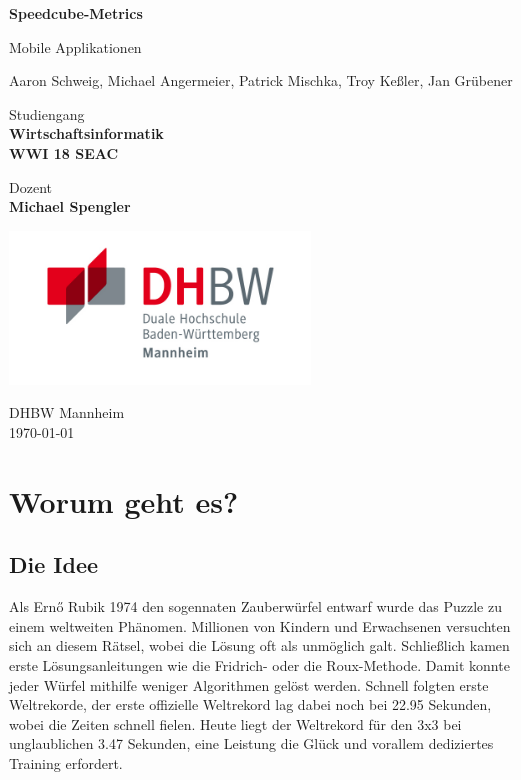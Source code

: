 \documentclass[a4paper]{article}
\theoremstyle{definition}
\begin{document}
\begin{titlepage}
	\begin{center}

		\Huge
		\textbf{Speedcube-Metrics}

		\vspace{0.5cm}
		\LARGE
		Mobile Applikationen

		\vspace{1.5cm}
		Aaron Schweig, Michael Angermeier, Patrick Mischka,
		Troy Keßler, Jan Grübener

		\vfill

		Studiengang\\
		\textbf{Wirtschaftsinformatik\\ WWI 18 SEAC}

		\vspace{0.8cm}

		Dozent\\
		\textbf{Michael Spengler}

		\vspace{0.8cm}

		\vspace{0.8cm}

		\includegraphics[width=0.6\textwidth]{img/dhbw.jpg}

		\Large
		DHBW Mannheim\\
		\today

	\end{center}
\end{titlepage}

\section{Worum geht es?}
\subsection{Die Idee}
Als Ernő Rubik 1974 den sogennaten Zauberwürfel entwarf wurde das Puzzle zu einem weltweiten Phänomen.
Millionen von Kindern und Erwachsenen versuchten sich an diesem Rätsel, wobei die Lösung oft als unmöglich
galt. Schließlich kamen erste Lösungsanleitungen wie die Fridrich- oder die Roux-Methode. Damit konnte jeder Würfel
mithilfe weniger Algorithmen gelöst werden. Schnell folgten erste Weltrekorde, der erste offizielle
Weltrekord lag dabei noch bei 22.95 Sekunden, wobei die Zeiten schnell fielen. Heute liegt der Weltrekord für den
3x3 bei unglaublichen 3.47 Sekunden, eine Leistung die Glück und vorallem dediziertes Training erfordert.
\end{document}
